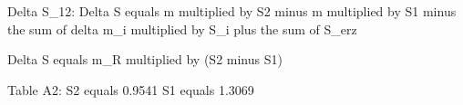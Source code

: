 Delta S_12:  
Delta S equals m multiplied by S2 minus m multiplied by S1 minus the sum of delta m_i multiplied by S_i plus the sum of S_erz  

Delta S equals m_R multiplied by (S2 minus S1)  

Table A2:  
S2 equals 0.9541  
S1 equals 1.3069